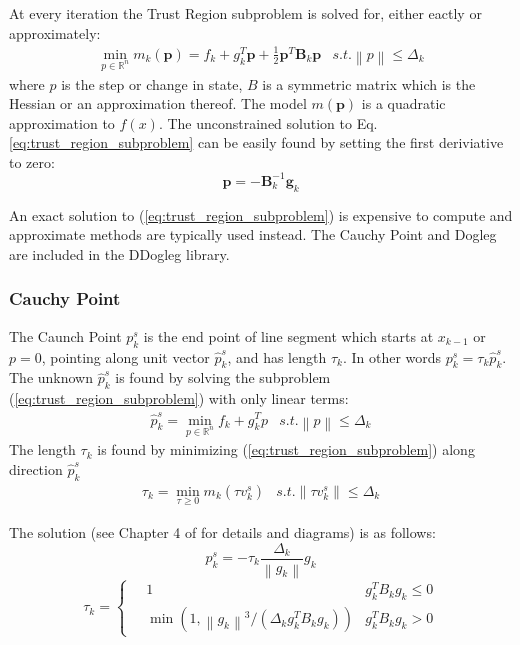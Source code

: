 \documentclass[peerreview,compsoc,onecolumn]{IEEEtran}
\newcommand{\R}{\mathbb{R}}
\newcommand{\norm}[1]{\left\lVert#1\right\rVert}
\begin{document}
At every iteration the Trust Region subproblem is solved for, either eactly or approximately:
\begin{equation}
\begin{array}{lr}
\min\limits_{p\in \R^n} m_k(\bm{p}) = f_k + g^T_k \bm{p} + \frac{1}{2}\bm{p}^T \bm{B}_k \bm{p} & s.t. \norm{p} \le \Delta_k
\end{array}
\label{eq:trust_region_subproblem}
\end{equation}
where $p$ is the step or change in state, $B$ is a symmetric matrix which is the Hessian or an approximation thereof. The model $m(\bm{p})$ is a quadratic approximation to $f(x)$. The unconstrained solution to Eq. \ref{eq:trust_region_subproblem} can be easily found by setting the first deriviative to zero:
\begin{equation}
\bm{p} = -\bm{B}^{-1}_k \bm{g}_k
\label{eq:TR_unconstrained_solution}
\end{equation}

An exact solution to (\ref{eq:trust_region_subproblem}) is expensive to compute and approximate methods are typically used instead. The Cauchy Point and Dogleg are included in the DDogleg library.

\subsubsection{Cauchy Point}
\label{section:cauchy} 

The Caunch Point $p^s_k$ is the end point of line segment which starts at $x_{k-1}$ or $p=0$, pointing along unit vector $\hat{p}^s_k$, and has length $\tau_k$. In other words $p^s_k = \tau_k \hat{p}^s_k$. The unknown $\hat{p}^s_k$ is found by solving the subproblem (\ref{eq:trust_region_subproblem}) with only linear terms:
\begin{equation}
\begin{array}{lr}
\hat{p}^s_k = \min\limits_{p\in \R^n} f_k + g_k^T p & s.t. \norm{p} \le \Delta_k
\end{array}
\end{equation}
The length $\tau_k$ is found by minimizing (\ref{eq:trust_region_subproblem}) along direction $\hat{p}^s_k$
\begin{equation}
\begin{array}{lr}
\tau_k = \min\limits_{\tau \ge 0} m_k(\tau v^s_k) & s.t. \norm{\tau v^s_k} \le \Delta_k
\end{array}
\end{equation}

The solution (see Chapter 4 of \cite{numopt2006} for details and diagrams) is as follows:
\begin{equation}
p^s_k = -\tau_k \frac{\Delta_k}{\norm{g_k}}g_k
\label{eq:cauchy_p}
\end{equation}
\begin{equation}
\tau_k = 
	\begin{cases}
		\quad 1 & g_k^T B_k g_k \le 0 \\
		\quad \min\left(1,\norm{g_k}^3/(\Delta_k g_k^T B_k g_k)\right) & g_k^T B_k g_k > 0
	\end{cases}
	\label{eq:cauchy_tau}
\end{equation}
\end{document}
